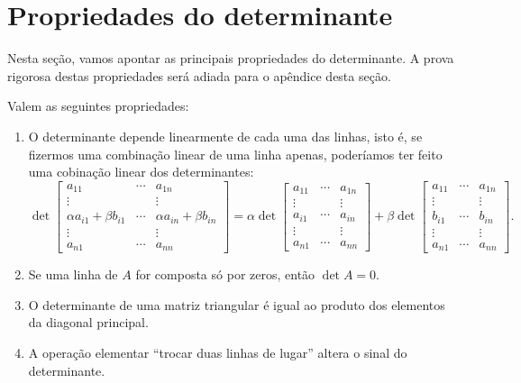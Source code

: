 \documentclass[../livro.tex]{subfiles}  %
\begin{document}
\section{Propriedades do determinante}

Nesta seção, vamos apontar as principais propriedades do determinante. A prova rigorosa destas propriedades será adiada para o apêndice desta seção.

\begin{theorem}\label{thm:prop-det}
Valem as seguintes propriedades:
\begin{enumerate}[$(i)$]
\item O determinante depende linearmente de cada uma das linhas, isto é, se fizermos uma combinação linear de uma linha apenas, poderíamos ter feito uma cobinação linear dos determinantes:
\[
\det \begin{bmatrix}
a_{11} & \cdots & a_{1n} \\
\vdots &  & \vdots \\
\alpha a_{i1} + \beta b_{i1}  & \cdots & \alpha a_{in} + \beta b_{in} \\
\vdots &  & \vdots \\
a_{n1} & \cdots & a_{nn}
\end{bmatrix} = 
\alpha \det \begin{bmatrix}
a_{11} & \cdots & a_{1n} \\
\vdots &  & \vdots \\
a_{i1} & \cdots & a_{in} \\
\vdots &  & \vdots \\
a_{n1} & \cdots & a_{nn}
\end{bmatrix} + \beta 
\det \begin{bmatrix}
a_{11} & \cdots & a_{1n} \\
\vdots &  & \vdots \\
b_{i1} & \cdots & b_{in} \\
\vdots &  & \vdots \\
a_{n1} & \cdots & a_{nn}
\end{bmatrix}.
\]

\item Se uma linha de $A$ for composta só por zeros, então $\det A = 0$.

\item O determinante de uma matriz triangular é igual ao produto dos elementos da diagonal principal.

\item A operação elementar ``trocar duas linhas de lugar'' altera o sinal do determinante.


\end{enumerate}
\end{theorem}
\end{document}
